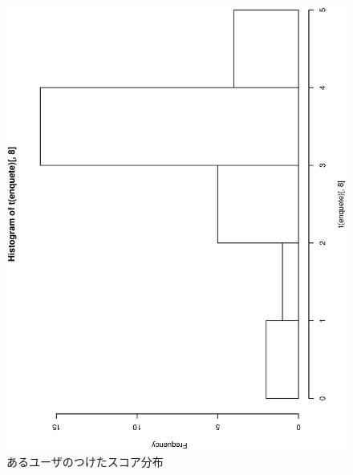 \documentclass[mingoth,a4paper]{jsarticle}
\begin{document}
\begin{figure}[h]
\begin{center}
 \includegraphics[width=0.8\hsize,angle=270]{image201301/score_hist_8.eps}

 \caption{あるユーザのつけたスコア分布}
 \label{fig:example-user-score-1}
\end{center}
\end{figure}
\end{document}
